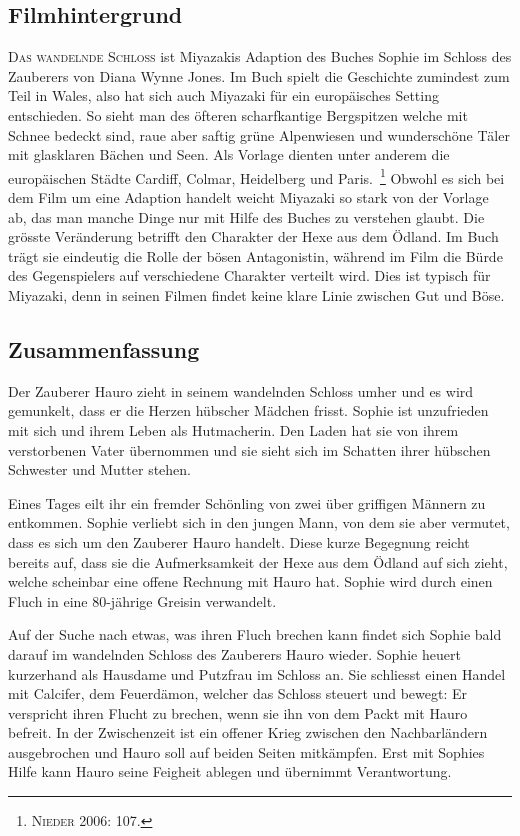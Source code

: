 \subsection{Filmhintergrund}
\textsc{Das wandelnde Schloss} ist Miyazakis Adaption des Buches \glqq Sophie im Schloss des Zauberers \grqq von Diana Wynne Jones. Im Buch spielt die Geschichte zumindest zum Teil in Wales, also hat sich auch Miyazaki für ein europäisches Setting entschieden. So sieht man des öfteren scharfkantige Bergspitzen welche mit Schnee bedeckt sind, raue aber saftig grüne Alpenwiesen und wunderschöne Täler mit glasklaren Bächen und Seen. Als Vorlage dienten unter anderem die europäischen Städte Cardiff, Colmar, Heidelberg und Paris.~\footnote{\textsc{Nieder} 2006: 107.} Obwohl es sich bei dem Film um eine Adaption handelt weicht Miyazaki so stark von der Vorlage ab, das man manche Dinge nur mit Hilfe des Buches zu verstehen glaubt. Die grösste Veränderung betrifft den Charakter der Hexe aus dem Ödland. Im Buch trägt sie eindeutig die Rolle der bösen Antagonistin, während im Film die Bürde des Gegenspielers auf verschiedene Charakter verteilt wird. Dies ist typisch für Miyazaki, denn in seinen Filmen findet keine klare Linie zwischen Gut und Böse. 

\subsection{Zusammenfassung}
Der Zauberer Hauro zieht in seinem wandelnden Schloss umher und es wird gemunkelt, dass er die Herzen hübscher Mädchen frisst. Sophie ist unzufrieden mit sich und ihrem Leben als Hutmacherin. Den Laden hat sie von ihrem verstorbenen Vater übernommen und sie sieht sich im Schatten ihrer hübschen Schwester und Mutter stehen. 

Eines Tages eilt ihr ein fremder Schönling von zwei über griffigen Männern zu entkommen. Sophie verliebt sich in den jungen Mann, von dem sie aber vermutet, dass es sich um den Zauberer Hauro handelt. Diese kurze Begegnung reicht bereits auf, dass sie die Aufmerksamkeit der Hexe aus dem Ödland auf sich zieht, welche scheinbar eine offene Rechnung mit Hauro hat. Sophie wird durch einen Fluch in eine 80-jährige Greisin verwandelt. 

Auf der Suche nach etwas, was ihren Fluch brechen kann findet sich Sophie bald darauf im wandelnden Schloss des Zauberers Hauro wieder. Sophie heuert kurzerhand als Hausdame und Putzfrau im Schloss an. Sie schliesst einen Handel mit Calcifer, dem Feuerdämon, welcher das Schloss steuert und bewegt: Er verspricht ihren Flucht zu brechen, wenn sie ihn von dem Packt mit Hauro befreit. In der Zwischenzeit ist ein offener Krieg zwischen den Nachbarländern ausgebrochen und Hauro soll auf beiden Seiten mitkämpfen. Erst mit Sophies Hilfe kann Hauro seine Feigheit ablegen und übernimmt Verantwortung. 

